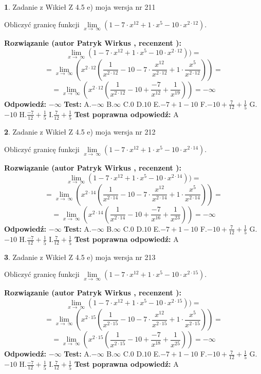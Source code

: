 \documentclass[12pt, a4paper]{article}
\theoremstyle{definition} %
\newtheorem{zad}{}
\newcommand{\zadStart}[1]{\begin{zad}#1\newline}
\newcommand{\zadStop}{\end{zad}}
\newcommand{\rozwStart}[2]{\noindent \textbf{Rozwiązanie (autor #1 , recenzent #2): }\newline}
\newcommand{\rozwStop}{\newline}
\newcommand{\odpStart}{\noindent \textbf{Odpowiedź:}\newline}
\newcommand{\odpStop}{\newline}
\newcommand{\testStart}{\noindent \textbf{Test:}\newline}
\newcommand{\testStop}{\newline}
\newcommand{\kluczStart}{\noindent \textbf{Test poprawna odpowiedź:}\newline}
\newcommand{\kluczStop}{\newline}
\begin{document}
\zadStart{Zadanie z Wikieł Z 4.5 e) moja wersja nr 211}



Obliczyć granicę funkcji  $\lim\limits_{x\to\ \infty}(1 - 7 \cdot x^{12}+1 \cdot x^{5}- 10 \cdot x^{2\cdot12})$.
\zadStop
\rozwStart{Patryk Wirkus}{}
$$\lim\limits_{x\to\ \infty}(1 - 7 \cdot x^{12}+1 \cdot x^{5}- 10 \cdot x^{2\cdot12}))=$$
$$=\lim\limits_{x\to\ \infty}(x^{2\cdot12}(\frac{1}{x^{2\cdot12}}-10 -7 \cdot \frac{x^{12}}{x^{2\cdot12}}+1 \cdot \frac{x^{5}}{x^{2\cdot12}}))=$$
$$=\lim\limits_{x\to\ \infty}(x^{2\cdot12}(\frac{1}{x^{2\cdot12}}-10 + \frac{-7}{x^{12}}+ \frac{1}{x^{19}}))=-\infty$$
\rozwStop
\odpStart
$-\infty$
\odpStop
\testStart
A.$-\infty$ B.$\infty$ C.$0$ D.$10$ E.$-7 + 1 - 10$
F.$-10+\frac{7}{12}+\frac{1}{5}$ G.$-10$
H.$\frac{-7}{12}+\frac{1}{5}$
I.$\frac{7}{12}+\frac{1}{5}$
\testStop
\kluczStart
A
\kluczStop



\zadStart{Zadanie z Wikieł Z 4.5 e) moja wersja nr 212}



Obliczyć granicę funkcji  $\lim\limits_{x\to\ \infty}(1 - 7 \cdot x^{12}+1 \cdot x^{5}- 10 \cdot x^{2\cdot14})$.
\zadStop
\rozwStart{Patryk Wirkus}{}
$$\lim\limits_{x\to\ \infty}(1 - 7 \cdot x^{12}+1 \cdot x^{5}- 10 \cdot x^{2\cdot14}))=$$
$$=\lim\limits_{x\to\ \infty}(x^{2\cdot14}(\frac{1}{x^{2\cdot14}}-10 -7 \cdot \frac{x^{12}}{x^{2\cdot14}}+1 \cdot \frac{x^{5}}{x^{2\cdot14}}))=$$
$$=\lim\limits_{x\to\ \infty}(x^{2\cdot14}(\frac{1}{x^{2\cdot14}}-10 + \frac{-7}{x^{16}}+ \frac{1}{x^{23}}))=-\infty$$
\rozwStop
\odpStart
$-\infty$
\odpStop
\testStart
A.$-\infty$ B.$\infty$ C.$0$ D.$10$ E.$-7 + 1 - 10$
F.$-10+\frac{7}{12}+\frac{1}{5}$ G.$-10$
H.$\frac{-7}{12}+\frac{1}{5}$
I.$\frac{7}{12}+\frac{1}{5}$
\testStop
\kluczStart
A
\kluczStop



\zadStart{Zadanie z Wikieł Z 4.5 e) moja wersja nr 213}



Obliczyć granicę funkcji  $\lim\limits_{x\to\ \infty}(1 - 7 \cdot x^{12}+1 \cdot x^{5}- 10 \cdot x^{2\cdot15})$.
\zadStop
\rozwStart{Patryk Wirkus}{}
$$\lim\limits_{x\to\ \infty}(1 - 7 \cdot x^{12}+1 \cdot x^{5}- 10 \cdot x^{2\cdot15}))=$$
$$=\lim\limits_{x\to\ \infty}(x^{2\cdot15}(\frac{1}{x^{2\cdot15}}-10 -7 \cdot \frac{x^{12}}{x^{2\cdot15}}+1 \cdot \frac{x^{5}}{x^{2\cdot15}}))=$$
$$=\lim\limits_{x\to\ \infty}(x^{2\cdot15}(\frac{1}{x^{2\cdot15}}-10 + \frac{-7}{x^{18}}+ \frac{1}{x^{25}}))=-\infty$$
\rozwStop
\odpStart
$-\infty$
\odpStop
\testStart
A.$-\infty$ B.$\infty$ C.$0$ D.$10$ E.$-7 + 1 - 10$
F.$-10+\frac{7}{12}+\frac{1}{5}$ G.$-10$
H.$\frac{-7}{12}+\frac{1}{5}$
I.$\frac{7}{12}+\frac{1}{5}$
\testStop
\kluczStart
A
\kluczStop
\end{document}
